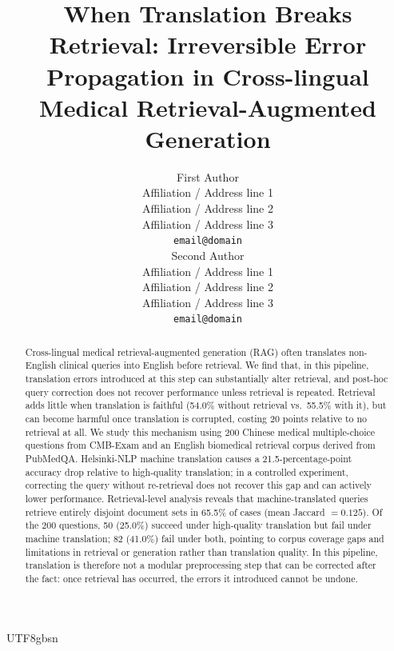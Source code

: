 \documentclass[11pt]{article}
\title{When Translation Breaks Retrieval: Irreversible Error Propagation in Cross-lingual Medical Retrieval-Augmented Generation}
\author{First Author \\
  Affiliation / Address line 1 \\
  Affiliation / Address line 2 \\
  Affiliation / Address line 3 \\
  \texttt{email@domain} \\\And
  Second Author \\
  Affiliation / Address line 1 \\
  Affiliation / Address line 2 \\
  Affiliation / Address line 3 \\
  \texttt{email@domain} \\}
\begin{document}
\begin{CJK}{UTF8}{gbsn}
\maketitle
\begin{abstract}
Cross-lingual medical retrieval-augmented generation (RAG) often translates non-English clinical queries into English before retrieval. We find that, in this pipeline, translation errors introduced at this step can substantially alter retrieval, and post-hoc query correction does not recover performance unless retrieval is repeated. Retrieval adds little when translation is faithful (54.0\% without retrieval vs.\ 55.5\% with it), but can become harmful once translation is corrupted, costing 20 points relative to no retrieval at all. We study this mechanism using 200 Chinese medical multiple-choice questions from CMB-Exam and an English biomedical retrieval corpus derived from PubMedQA. Helsinki-NLP machine translation causes a 21.5-percentage-point accuracy drop relative to high-quality translation; in a controlled experiment, correcting the query without re-retrieval does not recover this gap and can actively lower performance. Retrieval-level analysis reveals that machine-translated queries retrieve entirely disjoint document sets in 65.5\% of cases (mean Jaccard $= 0.125$). Of the 200 questions, 50 (25.0\%) succeed under high-quality translation but fail under machine translation; 82 (41.0\%) fail under both, pointing to corpus coverage gaps and limitations in retrieval or generation rather than translation quality. In this pipeline, translation is therefore not a modular preprocessing step that can be corrected after the fact: once retrieval has occurred, the errors it introduced cannot be undone.
\end{abstract}


\end{CJK}
\end{document}
